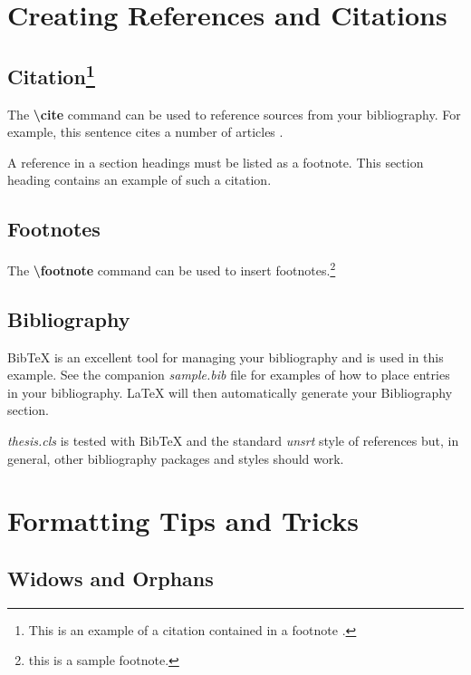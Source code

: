 \documentclass[master]{thesis}
\begin{document}
\chapter{Creating References and Citations}
\label{chap:references}

\section[Citation]{Citation\footnote{This is an example of a citation contained in a footnote \cite{cebl}.}}

The \textbf{\textbackslash cite} command can be used to reference sources from your bibliography.  For example, this sentence cites a number of articles \cite{forney2011classify, cebl, forney2011thesis, forney2015echostate, haykin2009neural}.

A reference in a section headings must be listed as a footnote.  This section heading contains an example of such a citation.

\section{Footnotes}

The \textbf{\textbackslash footnote} command can be used to insert footnotes.\footnote{this is a sample footnote.}

\section{Bibliography}

BibTeX is an excellent tool for managing your bibliography and is used in this example.  See the companion \textit{sample.bib} file for examples of how to place entries in your bibliography.  \LaTeX{} will then automatically generate your Bibliography section.

\textit{thesis.cls} is tested with BibTeX and the standard \textit{unsrt} style of references but, in general, other bibliography packages and styles should work.

\chapter{Formatting Tips and Tricks}
\label{chap:tips.and.tricks}

\section{Widows and Orphans}
\end{document}
